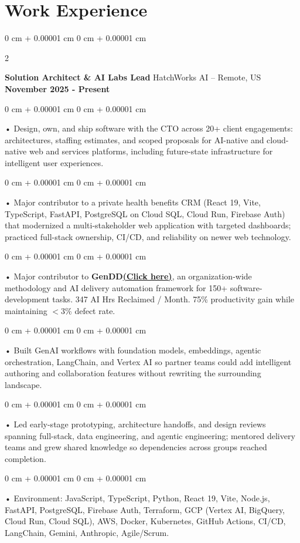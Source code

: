 \documentclass[10pt, letterpaper]{article}
\newenvironment{onecolentry}{
    \begin{adjustwidth}{
        0 cm + 0.00001 cm
    }{
        0 cm + 0.00001 cm
    }
}{
    \end{adjustwidth}
} %
\newenvironment{twocolentry}[2][]{
    \onecolentry
    \def\secondColumn{#2}
    \setcolumnwidth{\fill, 4.5 cm}
    \begin{paracol}{2}
}{
    \switchcolumn \raggedleft \secondColumn
    \end{paracol}
    \endonecolentry
} %
\begin{document}
    \vspace{0.5cm}
    \section{Work Experience}
        \vspace{0.1cm}

        \begin{twocolentry}{
            \textbf{November 2025 - Present}
        }
            \textbf{Solution Architect \& AI Labs Lead} HatchWorks AI -- Remote, US\end{twocolentry}

        \begin{onecolentry}
             • Design, own, and ship software with the CTO across 20+ client engagements: architectures, staffing estimates, and scoped proposals for AI-native and cloud-native web and services platforms, including future-state infrastructure for intelligent user experiences.
        \end{onecolentry}
        \begin{onecolentry}
             • Major contributor to a private health benefits CRM (React 19, Vite, TypeScript, FastAPI, PostgreSQL on Cloud SQL, Cloud Run, Firebase Auth) that modernized a multi-stakeholder web application with targeted dashboards; practiced full-stack ownership, CI/CD, and reliability on newer web technology.
        \end{onecolentry}
        \begin{onecolentry}
             • Major contributor to \textbf{GenDD}\href{https://hatchworks.com/generative-driven-development/}{\textbf{(Click here)}}, an organization-wide methodology and AI delivery automation framework for 150+ software-development tasks. 347 AI Hrs Reclaimed / Month. 75\% productivity gain while maintaining $<$3\% defect rate.
        \end{onecolentry}
        \begin{onecolentry}
             • Built GenAI workflows with foundation models, embeddings, agentic orchestration, LangChain, and Vertex AI so partner teams could add intelligent authoring and collaboration features without rewriting the surrounding landscape.
        \end{onecolentry}
        \begin{onecolentry}
             • Led early-stage prototyping, architecture handoffs, and design reviews spanning full-stack, data engineering, and agentic engineering; mentored delivery teams and grew shared knowledge so dependencies across groups reached completion.
        \end{onecolentry}
        \begin{onecolentry}
             • Environment: JavaScript, TypeScript, Python, React 19, Vite, Node.js, FastAPI, PostgreSQL, Firebase Auth, Terraform, GCP (Vertex AI, BigQuery, Cloud Run, Cloud SQL), AWS, Docker, Kubernetes, GitHub Actions, CI/CD, LangChain, Gemini, Anthropic, Agile/Scrum.
        \end{onecolentry}
\end{document}
